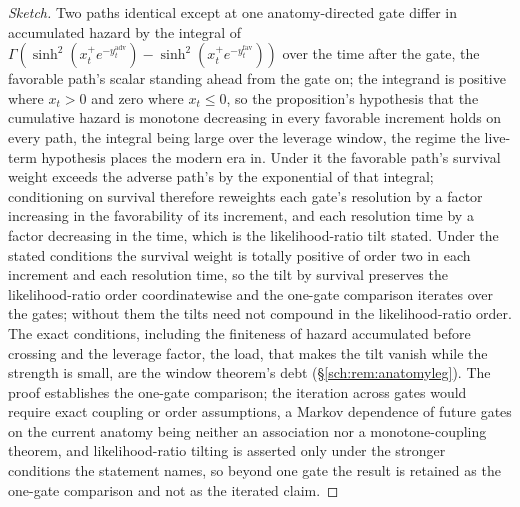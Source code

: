 \begin{proof}[Sketch]
Two paths identical except at one anatomy-directed gate differ in
accumulated hazard by the integral of
$\Gamma(\sinh^2(x_t^+e^{-y^{\mathrm{adv}}_t})-\sinh^2(x_t^+e^{-y^{\mathrm{fav}}_t}))$ over the
time after the gate, the favorable path's scalar standing ahead from the
gate on; the integrand is positive where $x_t>0$ and zero where
$x_t\le0$, so the proposition's hypothesis that the cumulative hazard is
monotone decreasing in every favorable increment holds on every path, the
integral being large over the leverage window, the regime the live-term
hypothesis places the modern era in. Under it the favorable path's survival
weight exceeds the adverse path's by the exponential of that integral; conditioning on survival therefore reweights each gate's
resolution by a factor increasing in the favorability of its
increment, and each resolution time by a factor decreasing in the
time, which is the likelihood-ratio tilt stated. Under the stated conditions the survival weight is totally positive of
order two in each increment and each resolution time, so the tilt by
survival preserves the likelihood-ratio order coordinatewise and the
one-gate comparison iterates over the gates; without them the tilts need
not compound in the likelihood-ratio order. The exact conditions, including the
finiteness of hazard accumulated before crossing and the leverage
factor, the load, that makes the tilt vanish while the strength is small,
are the window theorem's debt (\S\ref{sch:rem:anatomyleg}).
 The proof establishes the one-gate comparison; the iteration across gates would require exact coupling or order assumptions, a Markov dependence of future gates on the current anatomy being neither an association nor a monotone-coupling theorem, and likelihood-ratio tilting is asserted only under the stronger conditions the statement names, so beyond one gate the result is retained as the one-gate comparison and not as the iterated claim. \end{proof}

